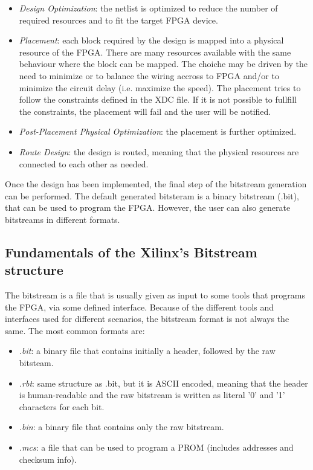 \begin{itemize}
    \item \textit{Design Optimization}: the netlist is optimized to reduce the number of required resources and to fit the target FPGA device.
    \item \textit{Placement}: each block required by the design is mapped into a physical resource of the FPGA. There are many resources available with the same behaviour where the block can be mapped. The choiche may be driven by the need to minimize or to balance the wiring accross to FPGA and/or to minimize the circuit delay (i.e. maximize the speed). The placement tries to follow the constraints defined in the XDC file. If it is not possible to fullfill the constraints, the placement will fail and the user will be notified.
    \item \textit{Post-Placement Physical Optimization}: the placement is further optimized.
    \item \textit{Route Design}: the design is routed, meaning that the physical resources are connected to each other as needed. 
\end{itemize}

Once the design has been implemented, the final step of the bitstream generation can be performed. The default generated bitsteram is a binary bitstream (.bit), that can be used to program the FPGA. However, the user can also generate bitstreams in different formats.

\subsection{Fundamentals of the Xilinx's Bitstream structure}

The bitstream is a file that is usually given as input to some tools that programs the FPGA, via some defined interface. Because of the different tools and interfaces used for different scenarios, the bitstream format is not always the same. The most common formats are:

\begin{itemize}
    \item \textit{.bit}: a binary file that contains initially a header, followed by the raw bitsteam.
    \item \textit{.rbt}: same structure as .bit, but it is ASCII encoded, meaning that the header is human-readable and the raw bitstream is written as literal '0' and '1' characters for each bit.
    \item \textit{.bin}: a binary file that contains only the raw bitstream.
    \item \textit{.mcs}: a file that can be used to program a PROM (includes addresses and checksum info).
\end{itemize}

